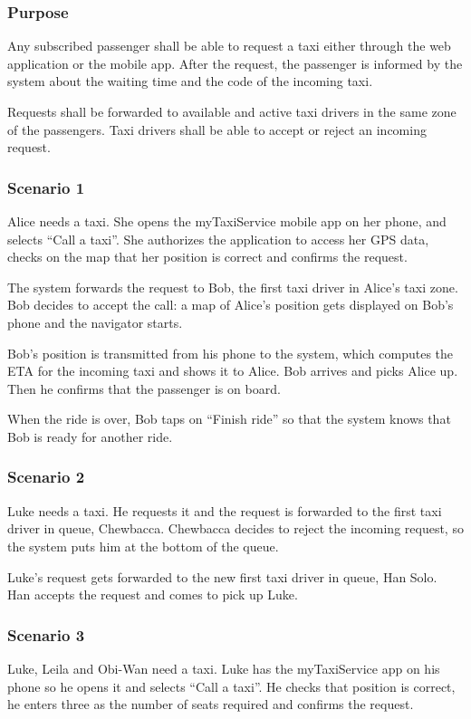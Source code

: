 \label{standard-call}
\subsubsection{Purpose}

Any subscribed passenger shall be able to request a taxi either through the web application or the mobile app.
After the request, the passenger is informed by the system about the waiting time and the code of the incoming taxi.

Requests shall be forwarded to available and active taxi drivers in the same zone of the passengers. Taxi drivers shall be able to accept or reject an incoming request.

\subsubsection{Scenario 1}
Alice needs a taxi. She opens the myTaxiService mobile app on her phone, and selects ``Call a taxi''. She authorizes the application to access her GPS data, checks on the map that her position is correct and confirms the request.

The system forwards the request to Bob, the first taxi driver in Alice's taxi zone. Bob decides to accept the call: a map of Alice's position gets displayed on Bob's phone and the navigator starts.

Bob's position is transmitted from his phone to the system, which computes the ETA for the incoming taxi and shows it to Alice. Bob arrives and picks Alice up. Then he confirms that the passenger is on board.

When the ride is over, Bob taps on ``Finish ride'' so that the system knows that Bob is ready for another ride.

\subsubsection{Scenario 2}
Luke needs a taxi. He requests it and the request is forwarded to the first taxi driver in queue, Chewbacca. Chewbacca decides to reject the incoming request, so the system puts him at the bottom of the queue.

Luke's request gets forwarded to the new first taxi driver in queue, Han Solo. Han accepts the request and comes to pick up Luke.

\subsubsection{Scenario 3}
Luke, Leila and Obi-Wan need a taxi. Luke has the myTaxiService app on his phone so he opens it and selects ``Call a taxi''. He checks that position is correct, he enters three as the number of seats required and confirms the request.


